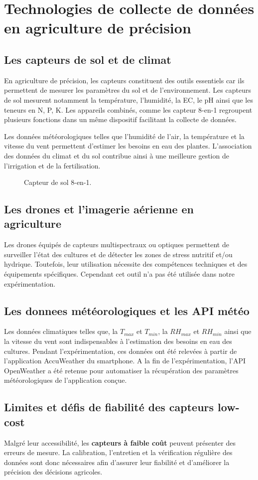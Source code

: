 \section{Technologies de collecte de données en agriculture de précision}

\subsection{Les capteurs de sol et de climat}
En agriculture de précision, les capteurs constituent des outils essentiels car ils permettent de mesurer les paramètres du sol et de l'environnement. Les capteurs de sol mesurent notamment la température, l'humidité, la EC, le pH ainsi que les teneurs en N, P, K. 
Les appareils combinés, comme les capteur 8-en-1 regroupent plusieurs fonctions dans un même dispositif facilitant la collecte de données.

Les données météorologiques telles que l'humidité de l'air, la température et la vitesse du vent permettent d'estimer les besoins en eau des plantes. 
L'association des données du climat et du sol contribue ainsi à une meilleure gestion de l'irrigation et de la fertilisation.

\begin{figure}[H]
    \centering
    \caption{Capteur de sol 8-en-1. }
    \label{fig:8_en_1}
\end{figure}

\subsection{Les drones et l’imagerie aérienne en agriculture}
Les drones équipés de capteurs multispectraux ou optiques permettent de surveiller l'état des cultures et de détecter les zones de stress nutritif et/ou hydrique. Toutefois, leur utilisation nécessite des compétences techniques et des équipements spécifiques. Cependant cet outil n'a pas été utilisée dans notre expérimentation.

\subsection{Les donnees météorologiques et les API météo}
Les données climatiques telles que, la $T_{max}$ et $T_{min}$, la $RH_{max}$ et $RH_{min}$ ainsi que la vitesse du vent sont indispensables à l'estimation des besoins en eau des cultures. 
Pendant l'expérimentation, ces données ont été relevées à partir de l'application AccuWeather du smartphone. A la fin de l'expérimentation, l'API OpenWeather a été retenue pour automatiser la récupération des paramètres météorologiques de l'application conçue.

\subsection{Limites et défis de fiabilité des capteurs low-cost}
Malgré leur accessibilité, les \textbf{capteurs à faible coût} peuvent présenter des erreurs de mesure. La calibration, l'entretien et la vérification régulière des données sont donc nécessaires afin d'assurer leur fiabilité et d'améliorer la précision des décisions agricoles.

